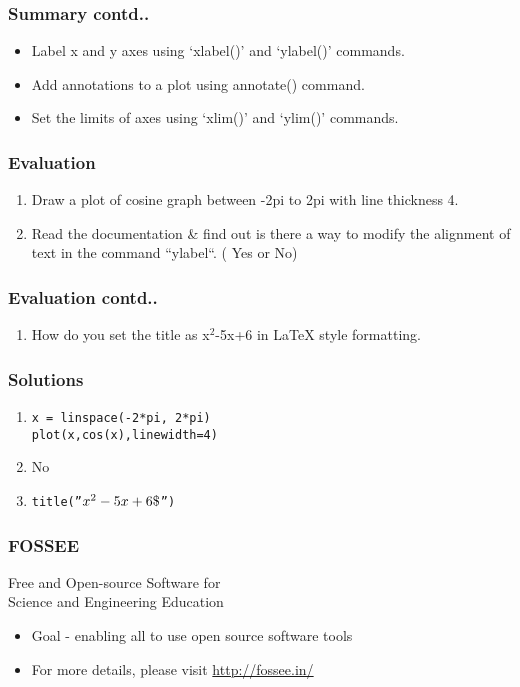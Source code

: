 \documentclass[17pt,compress]{beamer}
\newcounter{saveenumi}
\newcommand{\seti}{\setcounter{saveenumi}{\value{enumi}}}
\newcommand{\conti}{\setcounter{enumi}{\value{saveenumi}}}
\begin{document}
\begin{frame}
\frametitle{Summary contd..}
\label{sec-11.2}
\begin{itemize}
\item Label x and y axes using `xlabel()' and `ylabel()' commands.
\item Add annotations to a plot using annotate() command.
\item Set the limits of axes using `xlim()' and `ylim()' commands.
\end{itemize}
\end{frame}
\begin{frame}
\frametitle{Evaluation}
\label{sec-12}
\begin{enumerate}
\item Draw a plot of cosine graph between -2pi to 2pi with line thickness 4.\pause
\item Read the documentation \& find out is there a way to modify the alignment of text in the command ``ylabel``. ( Yes or No)
\seti
\end{enumerate}
\end{frame}
\begin{frame}
\frametitle{Evaluation contd..}
\label{sec-12.1}
\begin{enumerate}
\conti
\item How do you set the title as x$^2$-5x+6 in \LaTeX{} style formatting.
\end{enumerate}
\end{frame}
\begin{frame}
\frametitle{Solutions}
\label{sec-13}
\begin{enumerate}
\item \texttt{x = linspace(-2*pi, 2*pi)}\\
		\texttt{plot(x,cos(x),linewidth=4)}\pause
\item No\pause
\item \texttt{title(''$x^2-5x+6\char36$'')}
\end{enumerate}
\end{frame}
\begin{frame}
\frametitle{FOSSEE}
{\color{blue}Free and Open-source Software for \\Science and Engineering Education} \\
\begin{itemize}
\item Goal - enabling all to use open source software tools
\item For more details, please visit {\color{blue}\url{http://fossee.in/}}
\end{itemize}
\end{frame}
\end{document}
